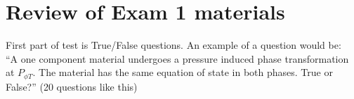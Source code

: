 \documentclass[12pt]{article}
\begin{document}

%
%
\section{Review of Exam 1 materials}
First part of test is True/False questions.  An example of a question would be:\\

``A one component material undergoes a pressure induced phase transformation at $P_{\phi T}$.  The material has the same equation of state in both phases.  True or False?'' (20 questions like this)\\
\end{document}
